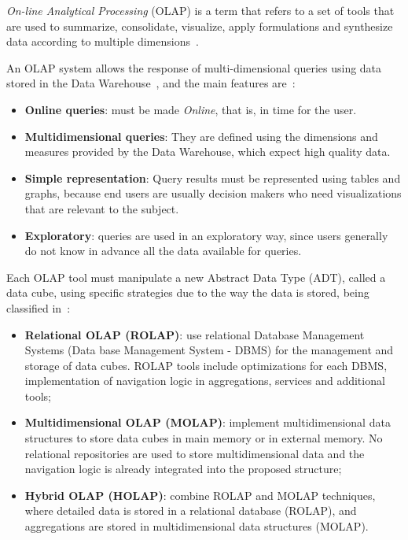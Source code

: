 \textit{On-line Analytical Processing} (OLAP) is a term that refers to a set of tools that are used to summarize, consolidate, visualize, apply formulations and synthesize data according to multiple dimensions~\cite{coddProvidingOlapUseranalysts1998}.

An OLAP system allows the response of multi-dimensional queries using data stored in the Data Warehouse~\cite{kimballDataWarehouseToolkit2013}, and the main features are~\cite{bimonteOpenIssuesBig2016}:

\begin{itemize}[noitemsep]
  \item \textbf{Online queries}: must be made \textit{Online}, that is, in time for the user.
  \item \textbf{Multidimensional queries}: They are defined using the dimensions and measures provided by the Data Warehouse, which expect high quality data.
  \item \textbf{Simple representation}: Query results must be represented using tables and graphs, because end users are usually decision makers who need visualizations that are relevant to the subject.
  \item \textbf{Exploratory}: queries are used in an exploratory way, since users generally do not know in advance all the data available for queries.
\end{itemize}

Each OLAP tool must manipulate a new Abstract Data Type (ADT), called a data cube, using specific strategies due to the way the data is stored, being classified in~\cite{moreiraFullPartialData2012}:

\begin{itemize}[noitemsep]
  \item \textbf{Relational OLAP (ROLAP)}: use relational Database Management Systems (Data base Management System - DBMS) for the management and storage of data cubes.
    ROLAP tools include optimizations for each DBMS, implementation of navigation logic in aggregations, services and additional tools;
  \item \textbf{Multidimensional OLAP (MOLAP)}: implement multidimensional data structures to store data cubes in main memory or in external memory.
    No relational repositories are used to store multidimensional data and the navigation logic is already integrated into the proposed structure;
  \item \textbf{Hybrid OLAP (HOLAP)}: combine ROLAP and MOLAP techniques, where detailed data is stored in a relational database (ROLAP), and aggregations are stored in multidimensional data structures (MOLAP).
\end{itemize}

